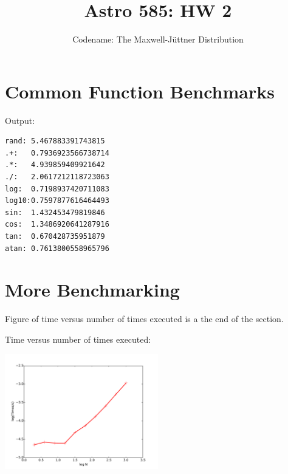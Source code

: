 \documentclass[11pt]{article}
\title{Astro 585: HW 2}
\author{Codename: The Maxwell-Jüttner Distribution}
\begin{document}
\maketitle

\section{Common Function Benchmarks}

Output:
\begin{verbatim}
rand: 5.467883391743815
.+:   0.7936923566738714
.*:   4.939859409921642
./:   2.0617212118723063
log:  0.7198937420711083
log10:0.7597877616464493
sin:  1.432453479819846
cos:  1.3486920641287916
tan:  0.670428735951879
atan: 0.7613800558965796
\end{verbatim}


\section{More Benchmarking}
Figure of time versus number of times executed is a the end of the section.

Time versus number of times executed:
\begin{center}
	\includegraphics[width=0.5\textwidth]{benchmark.pdf}
\end{center}
\end{document}
